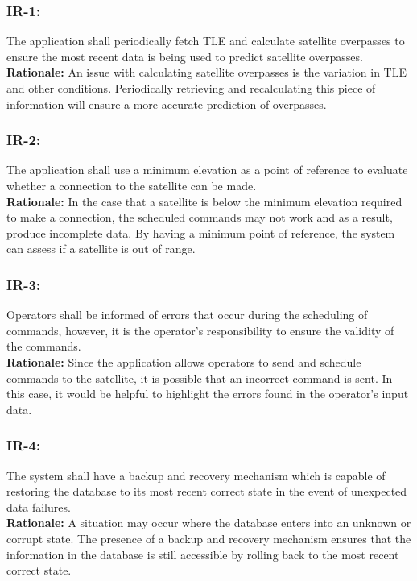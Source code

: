 \documentclass[12pt]{article}
\begin{document}
\subsubsection*{IR-1:}
The application shall periodically fetch TLE and calculate satellite overpasses to ensure the most recent data is being used to predict satellite overpasses. \\ 
\textbf{Rationale:} An issue with calculating satellite overpasses is the variation in TLE and other conditions. Periodically retrieving and recalculating this piece of information will ensure a more accurate prediction of overpasses.

\subsubsection*{IR-2:}
The application shall use a minimum elevation as a point of reference to evaluate whether a connection to the satellite can be made. \\
\textbf{Rationale:} In the case that a satellite is below the minimum elevation required to make a connection, the scheduled commands may not work and as a result, produce incomplete data. By having a minimum point of reference, the system can assess if a satellite is out of range.

\subsubsection*{IR-3:}
Operators shall be informed of errors that occur during the scheduling of commands, however, it is the operator’s responsibility to ensure the validity of the commands. \\
\textbf{Rationale:} Since the application allows operators to send and schedule commands to the satellite, it is possible that an incorrect command is sent.  In this case, it would be helpful to highlight the errors found in the operator’s input data.

\subsubsection*{IR-4:}
The system shall have a backup and recovery mechanism which is capable of restoring the database to its most recent correct state in the event of unexpected data failures. \\
\textbf{Rationale:} A situation may occur where the database enters into an unknown or corrupt state. The presence of a backup and recovery mechanism ensures that the information in the database is still accessible by rolling back to the most recent correct state.
\end{document}
